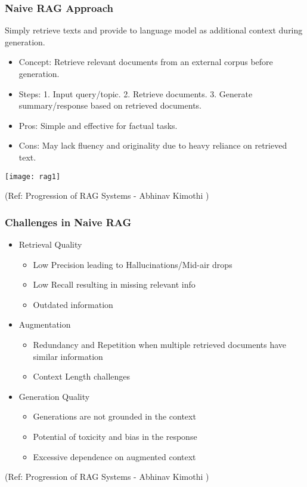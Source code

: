 \begin{frame}[fragile]\frametitle{Naive RAG Approach}

Simply retrieve texts and provide to language model as additional context during generation.

\begin{itemize}
\item Concept: Retrieve relevant documents from an external corpus before generation.
\item Steps: 1. Input query/topic. 2. Retrieve documents. 3. Generate summary/response based on retrieved documents.
\item Pros: Simple and effective for factual tasks.
\item Cons: May lack fluency and originality due to heavy reliance on retrieved text.
\end{itemize}	

\begin{center}
\texttt{[image: rag1]}

{\tiny (Ref: Progression of RAG Systems - Abhinav Kimothi )}
\end{center}		

\end{frame}

\begin{frame}[fragile]\frametitle{Challenges in Naive RAG}

\begin{itemize}
\item Retrieval Quality
	\begin{itemize}
	\item Low Precision leading to Hallucinations/Mid-air drops
	\item Low  Recall  resulting in  missing  relevant info
	\item Outdated information
	\end{itemize}
\item Augmentation
	\begin{itemize}
	\item Redundancy and Repetition when multiple retrieved documents have similar information
	\item Context Length challenges
	\end{itemize}
\item Generation Quality
	\begin{itemize}
	\item Generations are not grounded in the context 
	\item Potential of toxicity and bias in the response
	\item Excessive dependence on augmented context
	\end{itemize}
\end{itemize}	


{\tiny (Ref: Progression of RAG Systems - Abhinav Kimothi )}

\end{frame}

